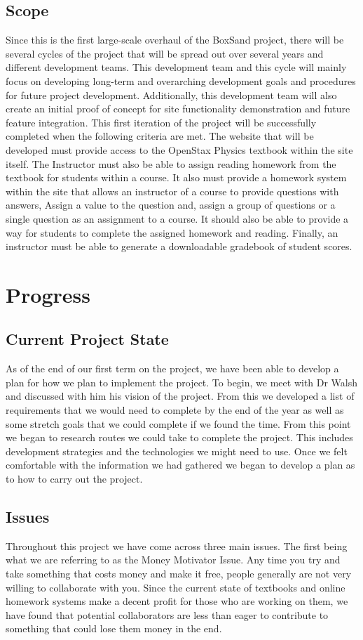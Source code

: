 \documentclass[onecolumn, draftclsnofoot,10pt, compsoc]{IEEEtran}
\begin{document}
\subsection{Scope}
Since this is the first large-scale overhaul of the BoxSand project, there will be several cycles of the project that will be spread out over several years and different development teams. This development team and this cycle will mainly focus on developing long-term and overarching development goals and procedures for future project development. Additionally, this development team will also create an initial proof of concept for site functionality demonstration and future feature integration.
This first iteration of the project will be successfully completed when the following criteria are met. The website that will be developed must provide access to the OpenStax Physics textbook within the site itself. The Instructor must also be able to assign reading homework from the textbook for students within a course. It also must provide a homework system within the site that allows an instructor of a course to provide questions with answers, Assign a value to the question and, assign a group of questions or a single question as an assignment to a course. It should also be able to provide a way for students to complete the assigned homework and reading. Finally, an instructor must be able to generate a downloadable gradebook of student scores.

\section{Progress}
\subsection{Current Project State}
As of the end of our first term on the project, we have been able to develop a plan for how we plan to implement the project. To begin, we meet with Dr Walsh and discussed with him his vision of the project. From this we developed a list of requirements that we would need to complete by the end of the year as well as some stretch goals that we could complete if we found the time. From this point we began to research routes we could take to complete the project. This includes development strategies and the technologies we might need to use. Once we felt comfortable with the information we had gathered we began to develop a plan as to how to carry out the project.


\subsection{Issues}
Throughout this project we have come across three main issues. The first being what we are referring to as the Money Motivator Issue. Any time you try and take something that costs money and make it free, people generally are not very willing to collaborate with you. Since the current state of textbooks and online homework systems make a decent profit for those who are working on them, we have found that potential collaborators are less than eager to contribute to something that could lose them money in the end.
\end{document}
